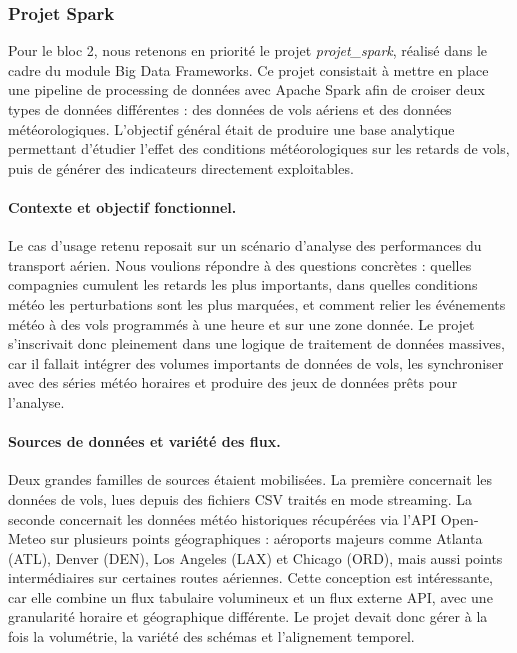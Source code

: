 \documentclass{article}
\begin{document}
\subsubsection{Projet Spark}

Pour le bloc 2, nous retenons en priorité le projet \textit{projet\_spark}, réalisé
dans le cadre du module Big Data Frameworks. Ce projet consistait à mettre en
place une pipeline de processing de données avec Apache Spark afin de croiser deux
types de données différentes : des données de vols aériens et des données météorologiques.
L'objectif général était de produire une base analytique permettant d'étudier
l'effet des conditions météorologiques sur les retards de vols, puis de générer
des indicateurs directement exploitables.

\paragraph{Contexte et objectif fonctionnel.}
Le cas d'usage retenu reposait sur un scénario d'analyse des performances du
transport aérien. Nous voulions répondre à des questions concrètes : quelles
compagnies cumulent les retards les plus importants, dans quelles conditions météo
les perturbations sont les plus marquées, et comment relier les événements météo à
des vols programmés à une heure et sur une zone donnée. Le projet s'inscrivait
donc pleinement dans une logique de traitement de données massives, car il fallait
intégrer des volumes importants de données de vols, les synchroniser avec des
séries météo horaires et produire des jeux de données prêts pour l'analyse.

\paragraph{Sources de données et variété des flux.}
Deux grandes familles de sources étaient mobilisées. La première concernait les
données de vols, lues depuis des fichiers CSV traités en mode streaming. La
seconde concernait les données météo historiques récupérées via l'API Open-Meteo
sur plusieurs points géographiques : aéroports majeurs comme Atlanta (ATL), Denver
(DEN), Los Angeles (LAX) et Chicago (ORD), mais aussi points intermédiaires sur certaines 
routes aériennes. Cette conception est intéressante, car elle combine un flux tabulaire 
volumineux et un flux externe API, avec une granularité horaire et géographique 
différente. Le projet devait donc gérer à la fois la volumétrie, la variété des schémas 
et l'alignement temporel.
\end{document}
